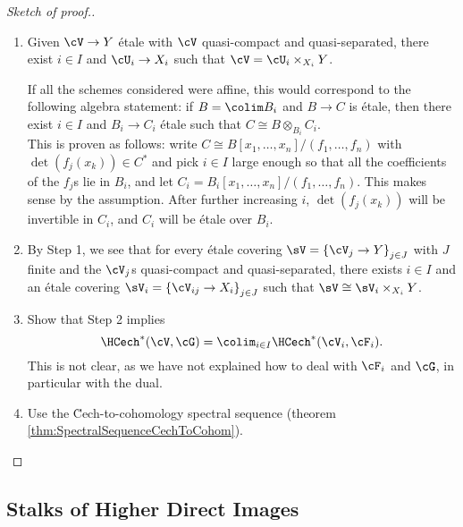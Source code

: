 
\begin{proof}[Sketch of proof.]$ $
\begin{enumerate}[\it Step 1.]
\item 
Given $\cV\to Y$ \'etale with $\cV$ quasi-compact and quasi-separated, there exist $i\in I$ and $\cU_i \to X_i$ such that $\cV = \cU_i \times_{X_i} Y$. 
\begin{remark}
If all the schemes considered were affine, this would correspond to the following algebra statement: if $B=\colim B_i$ and $B\to C$ is \'etale, then there exist $i\in I$ and $B_i\to C_i$ \'etale such that $C \cong B \otimes_{B_i} C_i$. 
\\
This is proven as follows: write $C \cong B\left[x_1,\ldots, x_n\right]/(f_1, \ldots, f_n)$ with $\det (f_j(x_k)) \in C^*$ and pick $i\in I$ large enough so that all the coefficients of the $f_j$s lie in $B_i$, and let $C_i = B_i\left[x_1, \ldots, x_n\right]/(f_1, \dots, f_n)$. This makes sense by the assumption. After further increasing $i$, $\det (f_j(x_k))$ will be invertible in $C_i$, and $C_i$ will be \'etale over $B_i$. 
\end{remark}
\item 
By Step 1, we see that for every \'etale covering $\sV = \left\{\cV_j\to Y\right\}_{j\in J}$ with $J$ finite and the $\cV_j$s quasi-compact and quasi-separated, there exists $i\in I$ and an \'etale covering $\sV_i = \left\{\cV_{ij} \to X_i \right\}_{j\in J}$ such that $\sV \cong \sV_i\times_{X_i} Y$. 
\item 
Show that Step 2 implies 
$$
\HCech^*(\cV, \cG)=\colim_{i\in I}\HCech^*(\cV_i, \cF_i).
$$ 
This is not clear, as we have not explained how to deal with $\cF_i$ and $\cG$, in particular with the dual.
\item 
Use the \u Cech-to-cohomology spectral sequence (theorem \ref{thm:SpectralSequenceCechToCohom}). 
\end{enumerate}
\end{proof}

\subsection{Stalks of Higher Direct Images}

